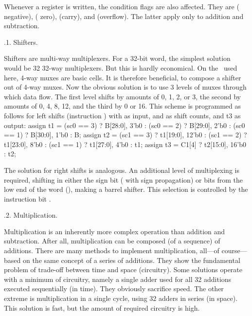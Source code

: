 Whenever a register is written, the condition flags are also affected. They are  ( negative),  ( zero),  (carry), and  (overflow). The latter apply only to addition and subtraction.

.1. Shifters.

Shifters are multi-way multiplexers. For a 32-bit word, the simplest solution would be 32 32-way multiplexers. But this is hardly economical. On the \FPGA\ used here, 4-way muxes are basic cells. It is therefore beneficial, to compose a shifter out of 4-way muxes. Now the obvious solution is to use 3 levels of muxes through which data flow. The first level shifts by amounts of 0, 1, 2, or 3, the second by amounts of 0, 4, 8, 12, and the third by 0 or 16. This scheme is programmed as follows for left shifts (instruction ) with  as input,  and  as shift counts, and t3 as output:
\begintt
assign t1 = (sc0 == 3) ? {B[28:0], 3'b0} :
            (sc0 == 2) ? {B[29:0], 2'b0} :
            (sc0 == 1) ? {B[30:0], 1'b0} : B;
assign t2 = (sc1 == 3) ? {t1[19:0], 12'b0} :
            (sc1 == 2) ? {t1[23:0], 8'b0} :
            (sc1 == 1) ? {t1[27:0], 4'b0} : t1;
assign t3 = C1[4] ? {t2[15:0], 16'b0} : t2;
\endtt

The solution for right shifts is analogous. An additional level of multiplexing is required, shifting in either the sign bit ( with sign propagation) or bits from the low end of the word (), making a barrel shifter. This selection is controlled by the instruction bit .

.2. Multiplication.

Multiplication is an inherently more complex operation than addition and subtraction. After all, multiplication can be composed (of a sequence) of additions. There are many methods to implement multiplication, all---of course---based on the same concept of a series of additions. They show the fundamental problem of trade-off between time and space (circuitry). Some solutions operate with a minimum of circuitry, namely a single adder used for all 32 additions executed sequentially (in time). They obviously sacrifice speed. The other extreme is multiplication in a single cycle, using 32 adders in series (in space). This solution is fast, but the amount of required circuitry is high.

